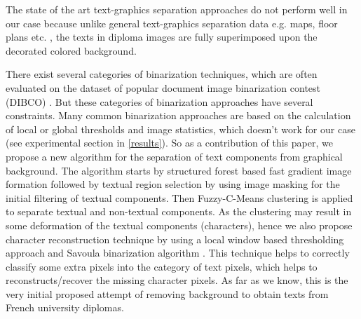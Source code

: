 \documentclass[runningheads]{llncs}
\begin{document}
The state of the art text-graphics separation approaches do not perform well in our case because unlike general text-graphics separation data e.g. maps, floor plans etc. \cite{Ahmed2012a}, the texts in diploma images are fully superimposed upon the decorated colored background. 

There exist several categories of binarization techniques, which are often evaluated on the dataset of popular document image binarization contest (DIBCO) \cite{Pratikakis2018}. But these categories of binarization approaches have several constraints. Many common binarization approaches are based on the calculation of local or global thresholds and image statistics, which doesn't work for our case (see experimental section in \ref{results}). So as a contribution of this paper, we propose a new algorithm for the separation of text components from graphical background. 
The algorithm starts by structured forest based fast gradient image formation followed by textual region selection by using image masking for the initial filtering of textual components. Then Fuzzy-C-Means clustering is applied to separate textual and non-textual components. As the clustering may result in some deformation of the textual components (characters), hence we also propose character reconstruction technique by using a local window based thresholding approach and Savoula binarization algorithm \cite{Sauvola2000}. This technique helps to correctly classify some extra pixels into the category of text pixels, which helps to reconstructs/recover the missing character pixels. As far as we know, this is the very initial proposed attempt of removing background to obtain texts from French university diplomas.
\end{document}
